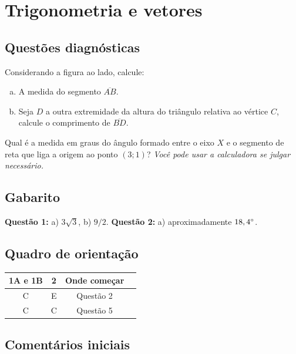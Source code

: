 \documentclass[main_estudante.tex]{subfiles}
\begin{document}
\chapter{Trigonometria e vetores}

\section{Questões diagnósticas}

\begin{diagnostico}
Considerando a figura ao lado, calcule:
\begin{enumerate}[a)]
  \item A medida do segmento $\overline{AB}$.
  \item Seja $D$ a outra extremidade da altura do triângulo relativa ao vértice $C$, calcule o comprimento de $\overline{BD}$.
\end{enumerate}
\end{diagnostico}
  
\begin{diagnostico}
Qual é a medida em graus do ângulo formado entre o eixo $X$ e o segmento de reta que liga a origem ao ponto $(3;1)$? \textit{Você pode usar a calculadora se julgar necessário.}
\end{diagnostico}

\section{Gabarito}

\textbf{Questão 1:} a) $3\sqrt{3}$, b) $9/2$. \textbf{Questão 2:} a) aproximadamente $18,4\degree$.

\section{Quadro de orientação}

\begin{center}
 \begin{tabular}{|c c c |c|} 
 \hline
 1A e 1B & 2 & Onde começar\\
 \hline
 C & E & Questão 2 \\ 
 \hline
 C & C & Questão 5 \\ 
 \hline
\end{tabular}
\end{center}

\section{Comentários iniciais}
\end{document}
